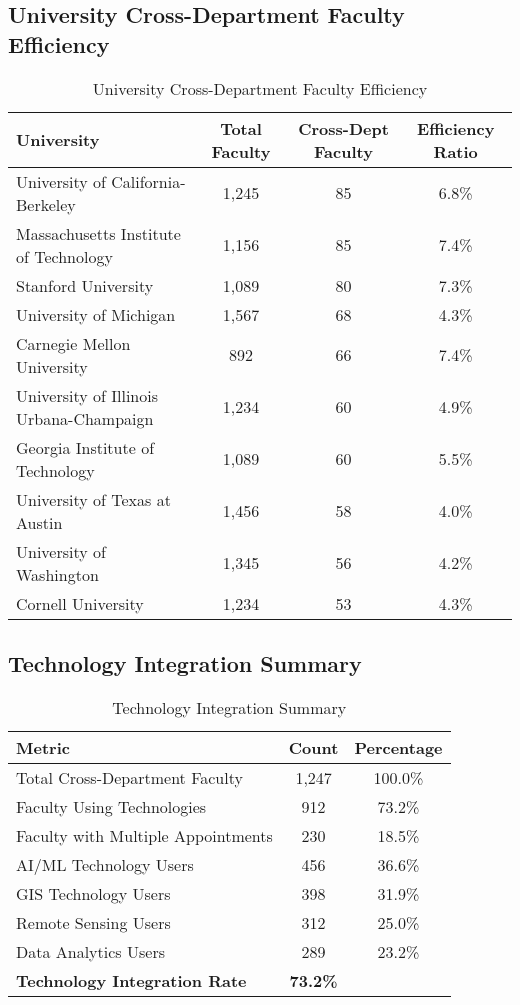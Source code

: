 \documentclass[12pt]{article}
\begin{document}
\subsection{University Cross-Department Faculty Efficiency}

\begin{table}[h]
\centering
\caption{University Cross-Department Faculty Efficiency}
\label{tab:university_efficiency}
\begin{tabular}{lccc}
\toprule
\textbf{University} & \textbf{Total Faculty} & \textbf{Cross-Dept Faculty} & \textbf{Efficiency Ratio} \\
\midrule
University of California-Berkeley & 1,245 & 85 & 6.8\% \\
Massachusetts Institute of Technology & 1,156 & 85 & 7.4\% \\
Stanford University & 1,089 & 80 & 7.3\% \\
University of Michigan & 1,567 & 68 & 4.3\% \\
Carnegie Mellon University & 892 & 66 & 7.4\% \\
University of Illinois Urbana-Champaign & 1,234 & 60 & 4.9\% \\
Georgia Institute of Technology & 1,089 & 60 & 5.5\% \\
University of Texas at Austin & 1,456 & 58 & 4.0\% \\
University of Washington & 1,345 & 56 & 4.2\% \\
Cornell University & 1,234 & 53 & 4.3\% \\
\bottomrule
\end{tabular}
\end{table}

\subsection{Technology Integration Summary}

\begin{table}[h]
\centering
\caption{Technology Integration Summary}
\label{tab:tech_integration_summary}
\begin{tabular}{lcc}
\toprule
\textbf{Metric} & \textbf{Count} & \textbf{Percentage} \\
\midrule
Total Cross-Department Faculty & 1,247 & 100.0\% \\
Faculty Using Technologies & 912 & 73.2\% \\
Faculty with Multiple Appointments & 230 & 18.5\% \\
AI/ML Technology Users & 456 & 36.6\% \\
GIS Technology Users & 398 & 31.9\% \\
Remote Sensing Users & 312 & 25.0\% \\
Data Analytics Users & 289 & 23.2\% \\
\midrule
\textbf{Technology Integration Rate} & \textbf{73.2\%} & \\
\bottomrule
\end{tabular}
\end{table}
\end{document}
